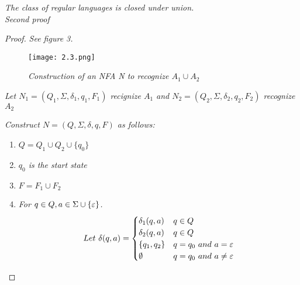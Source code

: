 \documentclass{article}
\begin{document}
\setcounter{defn}{4}
\begin{thm}
    \textit{The class of regular languages is closed under union.\\Second proof}
    \begin{proof}
        \textit{See figure 3.}
        \begin{figure}[b]
            \centering
            \texttt{[image: 2.3.png]}
            \caption{\textit{Construction of an NFA N to recognize $A_1 \cup A_2$}}
        \end{figure}

        \textit{Let $N_1 = (Q_1,\Sigma,\delta_1,q_1,F_1)$ recignize $A_1$ and $N_2 = (Q_2,\Sigma,\delta_2,q_2,F_2)$ recognize $A_2$}

        \textit{Construct $N = (Q,\Sigma,\delta,q,F)$ as follows:}

        \begin{enumerate}
            \item $Q = Q_1\cup Q_2\cup \{q_0\}$
            \item \textit{$q_0$ is the start state}
            \item $F = F_1\cup F_2$
            \item \textit{For $q\in Q,a\in \Sigma\cup\{\varepsilon\}$.}
            \[ 
                Let ~ \delta(q,a) = 
                \begin{cases}
                    \delta_1(q,a) & q\in Q \\
                    \delta_2(q,a) & q\in Q \\
                    \{q_1,q_2\} & q = q_0 ~ and ~ a = \varepsilon \\
                    \emptyset & q = q_0 ~ and ~ a \neq \varepsilon \\
                \end{cases}
            \]
        \end{enumerate}
    \end{proof}
\end{thm}
\end{document}
